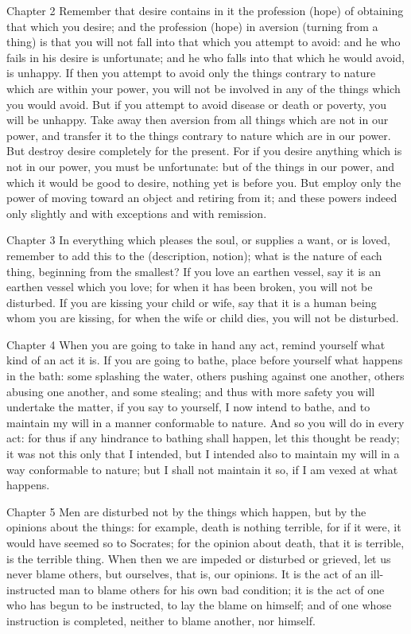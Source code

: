 Chapter 2 Remember that desire contains in it the profession (hope) of obtaining that which you desire; and the profession (hope) in aversion (turning from a thing) is that you will not fall into that which you attempt to avoid: and he who fails in his desire is unfortunate; and he who falls into that which he would avoid, is unhappy. If then you attempt to avoid only the things contrary to nature which are within your power, you will not be involved in any of the things which you would avoid. But if you attempt to avoid disease or death or poverty, you will be unhappy. Take away then aversion from all things which are not in our power, and transfer it to the things contrary to nature which are in our power. But destroy desire completely for the present. For if you desire anything which is not in our power, you must be unfortunate: but of the things in our power, and which it would be good to desire, nothing yet is before you. But employ only the power of moving toward an object and retiring from it; and these powers indeed only slightly and with exceptions and with remission.



Chapter 3 In everything which pleases the soul, or supplies a want, or is loved, remember to add this to the (description, notion); what is the nature of each thing, beginning from the smallest? If you love an earthen vessel, say it is an earthen vessel which you love; for when it has been broken, you will not be disturbed. If you are kissing your child or wife, say that it is a human being whom you are kissing, for when the wife or child dies, you will not be disturbed.



Chapter 4 When you are going to take in hand any act, remind yourself what kind of an act it is. If you are going to bathe, place before yourself what happens in the bath: some splashing the water, others pushing against one another, others abusing one another, and some stealing; and thus with more safety you will undertake the matter, if you say to yourself, I now intend to bathe, and to maintain my will in a manner conformable to nature. And so you will do in every act: for thus if any hindrance to bathing shall happen, let this thought be ready; it was not this only that I intended, but I intended also to maintain my will in a way conformable to nature; but I shall not maintain it so, if I am vexed at what happens.



Chapter 5 Men are disturbed not by the things which happen, but by the opinions about the things: for example, death is nothing terrible, for if it were, it would have seemed so to Socrates; for the opinion about death, that it is terrible, is the terrible thing. When then we are impeded or disturbed or grieved, let us never blame others, but ourselves, that is, our opinions. It is the act of an ill-instructed man to blame others for his own bad condition; it is the act of one who has begun to be instructed, to lay the blame on himself; and of one whose instruction is completed, neither to blame another, nor himself.



